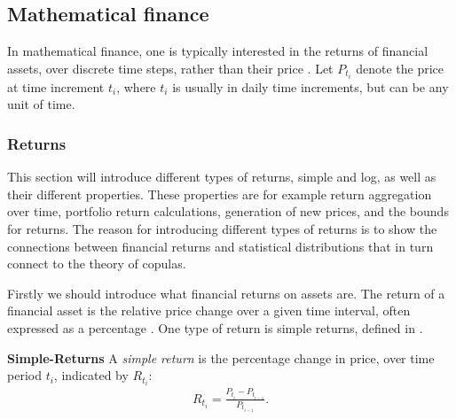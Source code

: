

\subsection{Mathematical finance}\label{sec:MathematicalFinance}
In mathematical finance, one is typically interested in the returns of financial assets, over discrete time steps, rather than their price \citet[p.~2]{Danielsson2011}. Let $P_{t_i}$ denote the price at time increment $t_i$, where $t_i$ is usually in daily time increments, but can be any unit of time. 


\subsubsection{Returns}
This section will introduce different types of returns, simple and log, as well as their different properties. These properties are for example return aggregation over time, portfolio return calculations, generation of new prices, and the bounds for returns. The reason for introducing different types of returns is to show the connections between financial returns and statistical distributions that in turn connect to the theory of copulas. 

Firstly we should introduce what financial returns on assets are. The return of a financial asset is the relative price change over a given time interval, often expressed as a percentage \citet[p.~2]{Danielsson2011}. One type of return is simple returns, defined in .

\begin{definition}\label{def:simpleReturns}
    \textbf{Simple-Returns} \citet[p.~3]{Danielsson2011}
    A \emph{simple return} is the percentage change in price, over time period $t_i$, indicated by $R_{t_i}$:
    \begin{align*}
        R_{t_i} = \frac{P_{t_i}-P_{t_{i-1}}}{P_{t_{i-1}}}.
    \end{align*}
\end{definition}

